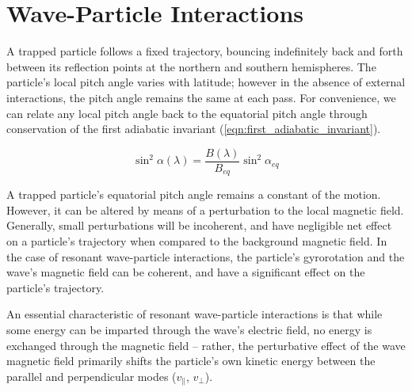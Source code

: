 \section{Wave-Particle Interactions}
\label{section:wpi}
A trapped particle follows a fixed trajectory, bouncing indefinitely back and forth between its reflection points at the northern and southern hemispheres. The particle's local pitch angle varies with latitude; however in the absence of external interactions, the pitch angle remains the same at each pass. For convenience, we can relate any local pitch angle back to the equatorial pitch angle through conservation of the first adiabatic invariant (\ref{eqn:first_adiabatic_invariant}).

\begin{equation}
\sin^2 \alpha (\lambda) = \frac{B(\lambda)}{B_{eq}} \sin^2 \alpha_{eq}
\end{equation}

A trapped particle's equatorial pitch angle remains a constant of the motion. However, it can be altered by means of a perturbation to the local magnetic field. Generally, small perturbations will be incoherent, and have negligible net effect on a particle's trajectory when compared to the background magnetic field. In the case of resonant wave-particle interactions, the particle's gyrorotation and the wave's magnetic field can be coherent, and have a significant effect on the particle's trajectory.

An essential characteristic of resonant wave-particle interactions is that while some energy can be imparted through the wave's electric field, no energy is exchanged through the magnetic field -- rather, the perturbative effect of the wave magnetic field primarily shifts the particle's own kinetic energy between the parallel and perpendicular modes ($v_\parallel$, $v_\perp$). 

